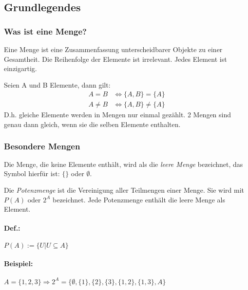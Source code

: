 \subsection{Grundlegendes}
\subsubsection*{Was ist eine Menge?}
Eine Menge ist eine Zusammenfassung unterscheidbarer Objekte zu einer
Gesamtheit. Die Reihenfolge der Elemente ist irrelevant. Jedes Element ist
einzigartig.

Seien A und B Elemente, dann gilt:
\begin{align}
  A = B    &\Leftrightarrow \{A, B\} = \{A\} \\
  A \neq B &\Leftrightarrow \{A, B\} \neq \{A\}
\end{align}
D.h. gleiche Elemente werden in Mengen nur einmal gezählt.
2 Mengen sind genau dann gleich, wenn sie die selben Elemente
enthalten.
\subsubsection*{Besondere Mengen}
Die Menge, die keine Elemente enthält, wird als die \emph{leere Menge} bezeichnet, das Symbol hierfür ist: $\{\}$ oder ${}\emptyset$.

Die \emph{Potenzmenge} ist die Vereinigung aller Teilmengen einer Menge.
Sie wird mit \(P(A)\) oder \(2^A\) bezeichnet. Jede Potenzmenge
enthält die leere Menge als Element.
\paragraph{Def.:} $P(A):= \{ U| {U}\subseteq{A} \}$
\paragraph{Beispiel:}
\begin{math}
{A = \{1,2,3\} }
\Rightarrow{2^A = \{ \emptyset, \{1\},\{2\},\{3\},\{1,2\},\{1,3\},A \} }
\end{math}